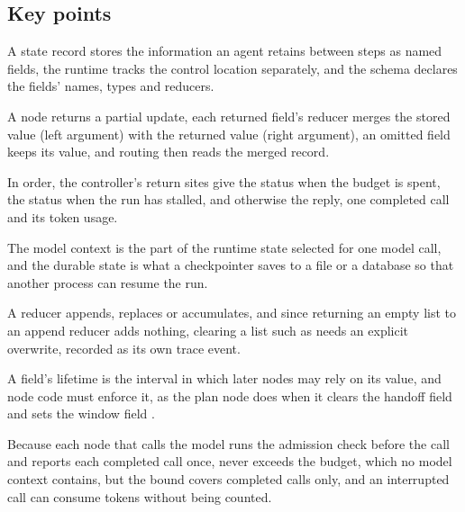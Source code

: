 \subsection*{Key points}
\bi
\item A state record stores the information an agent retains between steps as named fields, the
runtime tracks the control location separately, and the schema declares the fields' names, types
and reducers.
\item A node returns a partial update, each returned field's reducer merges the stored value (left
argument) with the returned value (right argument), an omitted field keeps its value, and routing
then reads the merged record.
\item In order, the controller's return sites give the status  when the
budget is spent, the status  when the run has stalled, and otherwise the reply,
one completed call and its token usage.
\item The model context is the part of the runtime state selected for one model call, and the
durable state is what a checkpointer saves to a file or a database so that another process can
resume the run.
\item A reducer appends, replaces or accumulates, and since returning an empty list to an append
reducer adds nothing, clearing a list such as  needs an explicit overwrite,
recorded as its own trace event.
\item A field's lifetime is the interval in which later nodes may rely on its value, and node code
must enforce it, as the plan node does when it clears the handoff field  and
sets the window field .
\item Because each node that calls the model runs the admission check before the call and reports
each completed call once,  never exceeds the budget, which no model context
contains, but the bound covers completed calls only, and an interrupted call can consume tokens
without being counted.
\ei

